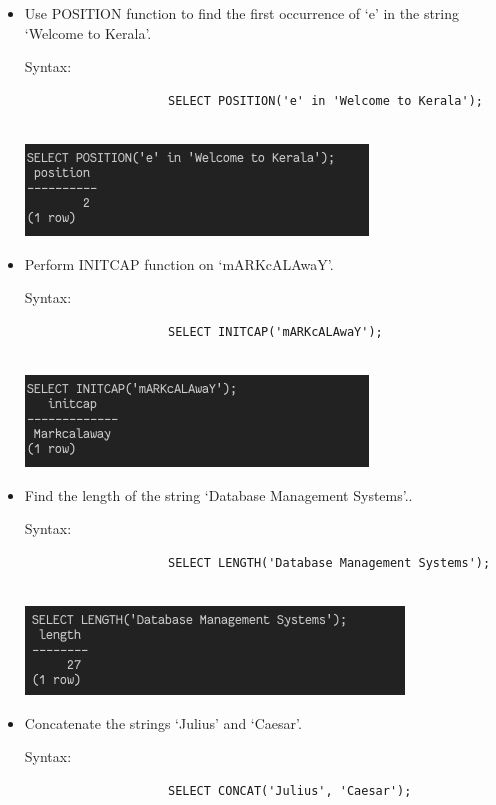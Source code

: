 \documentclass[13pt,oneside]{book}
\begin{document}
\begin{itemize}
					
					\item
					Use POSITION function to find the first occurrence of ‘e’ in the string
					 ‘Welcome to Kerala’.
					 
					Syntax:
					\begin{verbatim}
					SELECT POSITION('e' in 'Welcome to Kerala');
					
					\end{verbatim}
					\includegraphics[]{img/p6/ss17.png}
					
					
					\item
					Perform INITCAP function on ‘mARKcALAwaY’.
					 
					Syntax:
					\begin{verbatim}
					SELECT INITCAP('mARKcALAwaY');
					
					\end{verbatim}
					\includegraphics[]{img/p6/ss18.png}
					
					
					\item
					Find the length of the string ‘Database Management Systems’..
					 
					Syntax:
					\begin{verbatim}
					SELECT LENGTH('Database Management Systems');
					
					\end{verbatim}
					\includegraphics[]{img/p6/ss19.png}
					
					
					\item
					Concatenate the strings ‘Julius’ and ‘Caesar’.
					 
					Syntax:
					\begin{verbatim}
					SELECT CONCAT('Julius', 'Caesar');
					

\end{verbatim}
\end{itemize}
\end{document}
